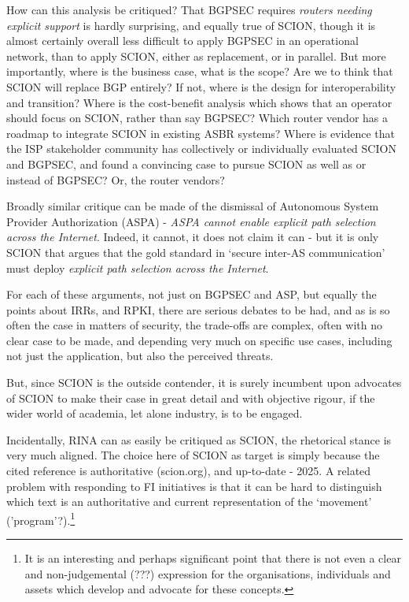 How can this analysis be critiqued?  That BGPSEC requires \emph{routers needing explicit support} is hardly surprising, and equally true of SCION, though it is almost certainly overall less difficult to apply BGPSEC in an operational network, than to apply SCION, either as replacement, or in parallel.  But more importantly, where is the business case, what is the scope?  Are we to think that SCION will replace BGP entirely?  If not, where is the design for interoperability and transition?  Where is the cost-benefit analysis which shows that an operator should focus on SCION, rather than say BGPSEC?  Which router vendor has a roadmap to integrate SCION in existing ASBR systems?  Where is evidence that the ISP stakeholder community has collectively or individually evaluated SCION and BGPSEC, and found a convincing case to pursue SCION as well as or instead of BGPSEC?  Or, the router vendors?

Broadly similar critique can be made of the dismissal of Autonomous System Provider Authorization (ASPA) - \emph{ASPA cannot enable explicit path selection across the Internet}.  Indeed, it cannot, it does not claim it can - but it is only SCION that argues that the gold standard in `secure inter-AS communication' must deploy \emph{explicit path selection across the Internet}.

For each of these arguments, not just on BGPSEC and ASP, but equally the points about IRRs, and RPKI, there are serious debates to be had, and as is so often the case in matters of security, the trade-offs are complex, often with no clear case to be made, and depending very much on specific use cases, including not just the application, but also the perceived threats.

But, since SCION is the outside contender, it is surely incumbent upon advocates of SCION to make their case in great detail and with objective rigour, if the wider world of academia, let alone industry, is to be engaged.

Incidentally, RINA can as easily be critiqued as SCION, the rhetorical stance is very much aligned.  The choice here of SCION as target is simply because the cited reference is authoritative (scion.org), and up-to-date - 2025.  A related problem with responding to FI initiatives is that it can be hard to distinguish which text is an authoritative and current representation of the `movement' ('program'?).\footnote{It is an interesting and perhaps significant point that there is not even a clear and non-judgemental (???) expression for the organisations, individuals and assets which develop and advocate for these concepts.}

